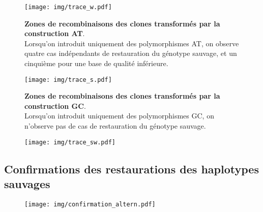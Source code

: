 \begin{figure}[p]%
  \begin{leftfullpage}
    \texttt{[image: img/trace\_w.pdf]}
    \caption[Zones de recombinaison des clones transformés par la construction
    AT]{\label{fig:tracew}\textbf{Zones de recombinaisons des clones transformés
        par la construction AT}. \\
      \rmfamily Lorsqu'on introduit uniquement des
      polymorphismes AT, on observe quatre cas indépendants de restauration du
      génotype sauvage, et un cinquième pour une base de qualité inférieure. }
  \end{leftfullpage}
\end{figure}
\begin{figure}[p]%
  \begin{fullpage}
    \texttt{[image: img/trace\_s.pdf]}
    \caption[Zones de recombinaisons des clones transformés par la construction
    GC]{\label{fig:traces} \textbf{Zones de recombinaisons des clones
        transformés par la construction GC}. \\
      \rmfamily Lorsqu'on introduit uniquement des polymorphismes GC, on n'observe pas de
      cas de restauration du génotype sauvage. }
  \end{fullpage}
\end{figure}
\begin{figure}[p]%
  \begin{leftfullpage}
    \texttt{[image: img/trace\_sw.pdf]}
    \caption[Zones de recombinaisons des clones transformés par la construction
    AT/GC]{\label{fig:tracesw} }
  \end{leftfullpage}
\end{figure}

\subsection{Confirmations des restaurations des haplotypes sauvages}
\label{subsec:confirm-haplotype}


\begin{figure}[ht]
  \centering
  \texttt{[image: img/confirmation\_altern.pdf]}
  \caption{\label{fig:confirm-haplotype} }
\end{figure}


